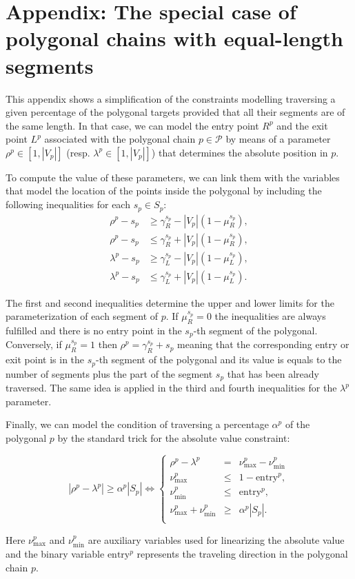 \section*{Appendix: The special case of polygonal chains with equal-length segments\label{appendix}}

This appendix shows a simplification of the constraints modelling traversing a given percentage of the polygonal targets provided that all their segments are of the same length. In that case, we can model the entry point $R^p$ and the exit point $L^p$ associated with the polygonal chain $p\in\mathcal P$ by means of a parameter $\rho^p\in[1, |V_p|]$ (resp. $\lambda^p\in[1, |V_p|]$) that determines the absolute position in $p$. 

To compute the value of these parameters, we can link them with the variables that model the location of the points inside the polygonal by including the following inequalities for each $s_p\in S_p$:
\begin{align*}
    \rho^p - s_p &\geq \gamma_R^{s_p} - |V_p|(1-\mu_R^{s_p}),\\
    \rho^p - s_p &\leq \gamma_R^{s_p} + |V_p|(1-\mu_R^{s_p}),\\
    \lambda^p - s_p &\geq \gamma_L^{s_p} - |V_p|(1-\mu_L^{s_p}),\\
    \lambda^p - s_p &\leq \gamma_L^{s_p} + |V_p|(1-\mu_L^{s_p}).
\end{align*}

The first and second inequalities determine the upper and lower limits for the parameterization of each segment of $p$. If $\mu_R^{s_p}=0$ the inequalities are always fulfilled and there is no entry point in the $s_p$-th segment of the polygonal. Conversely, if $\mu_R^{s_p}=1$ then $\rho^p=\gamma_R^{s_p}+s_p$ meaning that the corresponding entry or exit point is in the $s_p$-th segment of the polygonal and its value is equals to the number of segments plus the part of the segment $s_p$ that has been already traversed. The same idea is applied in the third and fourth inequalities for the $\lambda^p$ parameter.

Finally, we can model the condition of traversing a percentage $\alpha^p$ of the polygonal $p$ by the standard trick for the absolute value constraint:

\begin{equation}\label{eq:alpha-p}\tag{$\alpha-\mathcal P$}
 |\rho^{p}-\lambda^{p}|\geq \alpha^{p} |S_p| \Longleftrightarrow
 \left\{
 \begin{array}{ccl}
  \rho^{p} - \lambda^{p} & = & \nu_\text{max}^{p} - \nu_\text{min}^{p} \\
  \nu_\text{max}^{p} & \leq & 1-{\text{entry}^{p}}, \\
  \nu_\text{min}^{p} & \leq & {  \text{entry}^{p}}, \\
  \nu_\text{max}^{p} + \nu_\text{min}^{p} & \geq & \alpha^{p} |S_p|. \\
 \end{array}
 \right.
\end{equation}

Here $\nu_\text{max}^p$ and $\nu_\text{min}^p$ are auxiliary variables used for linearizing the absolute value and the binary variable $\text{entry}^p$ represents the traveling direction in the polygonal chain $p$.


